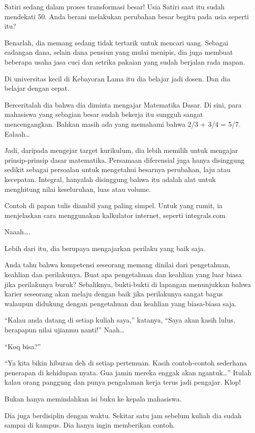 Satiri sedang dalam proses transformasi besar! Usia Satiri saat itu sudah mendekati 50. Anda berani melakukan perubahan besar begitu pada usia seperti itu?

Benarlah, dia memang sedang tidak tertarik untuk mencari uang. Sebagai cadangan dana, selain dana pensiun yang mulai menipis, dia juga membuat beberapa usaha jasa cuci dan setrika pakaian yang sudah berjalan rada mapan.

Di universitas kecil di Kebayoran Lama itu dia belajar jadi dosen. Dan dia belajar dengan cepat.

Berceritalah dia bahwa dia diminta mengajar Matematika Dasar. Di sini, para mahasiswa yang sebagian besar sudah bekerja itu sungguh sangat mencengangkan. Bahkan masih ada yang memahami bahwa 2/3 + 3/4 = 5/7. Ealaah…

Jadi, daripada mengejar target kurikulum, dia lebih memilih untuk mengajar prinsip-prinsip dasar matematika. Persamaan diferensial juga hanya disinggung sedikit sebagai persoalan untuk mengetahui besarnya perubahan, laju atau kecepatan. Integral, hanyalah disinggung bahwa itu adalah alat untuk menghitung nilai keseluruhan, luas atau volume.

Contoh di papan tulis diambil yang paling simpel. Untuk yang rumit, ia menjelaskan cara menggunakan kalkulator internet, seperti integrals.com

Naaah….

Lebih dari itu, dia berupaya mengajarkan perilaku yang baik saja.

Anda tahu bahwa kompetensi seseorang memang dinilai dari pengetahuan, keahlian dan perilakunya. Buat apa pengetahuan dan keahlian yang luar biasa jika perilakunya buruk? Sebaliknya, bukti-bukti di lapangan menunjukkan bahwa karier seseorang akan melaju dengan baik jika perilakunya sangat bagus walaupun didukung dengan pengetahuan dan keahlian yang biasa-biasa saja.

“Kalau anda datang di setiap kuliah saya,” katanya, “Saya akan kasih lulus, berapapun nilai ujianmu nanti!” Naah…

“Koq bisa?”

“Ya kita bikin hiburan deh di setiap pertemuan. Kasih contoh-contoh sederhana penerapan di kehidupan nyata. Gua jamin mereka enggak akan ngantuk…” Itulah kalau orang panggung dan punya pengalaman kerja terus jadi pengajar. Klop!

Bukan hanya memindahkan isi buku ke kepala mahasiswa.

Dia juga berdisiplin dengan waktu. Sekitar satu jam sebelum kuliah dia sudah sampai di kampus. Dia hanya ingin memberikan contoh.


